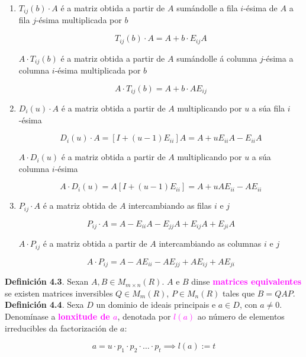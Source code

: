 \documentclass[twoside]{report}
\newcommand{\magbf}[1]{\textcolor{magenta}{\textbf{#1}}} %
\newcommand{\magen}[1]{\textcolor{magenta}{#1}}
\theoremstyle{mystyle}
\begin{document}
\begin{enumerate}
    \item $T_{ij}(b) \cdot A$ é a matriz obtida a partir de $A$ sumándolle a fila $i$-ésima de $A$ a fila $j$-ésima multiplicada por $b$
    
    $$T_{ij}(b) \cdot A = A + b \cdot E_{ij}A$$
    
    $A \cdot T_{ij}(b)$ é a matriz obtida a partir de $A$ sumándolle á columna $j$-ésima a columna $i$-ésima multiplicada por $b$
    
    $$A \cdot T_{ij}(b) = A + b \cdot AE_{ij}$$
    
    \item $D_{i}(u) \cdot A$ é a matriz obtida a partir de $A$ multiplicando por $u$ a súa fila $i$-ésima
    
    $$D_{i}(u) \cdot A = [I + (u-1)E_{ii}]A = A + uE_{ii}A - E_{ii}A$$
    
    $A \cdot D_{i}(u)$ é a matriz obtida a partir de $A$ multiplicando por $u$ a súa columna $i$-ésima
    
    $$A \cdot D_{i}(u) = A[I + (u-1)E_{ii}] = A + uAE_{ii} - AE_{ii}$$
    
    \item $P_{ij} \cdot A$ é a matriz obtida de $A$ intercambiando as filas $i$ e $j$
    
    $$P_{ij} \cdot A = A - E_{ii}A -E_{jj}A + E_{ij}A + E_{ji}A$$
    
    $A \cdot P_{ij}$ é a matriz obtida a partir de $A$ intercambiando as columnas $i$ e $j$
    
    $$A \cdot P_{ij} = A - AE_{ii} - AE_{jj} + AE_{ij} + AE_{ji}$$

\end{enumerate}

\vspace{5mm}

\noindent \textbf{Definición 4.3}. Sexan $A,B \in M_{m \times n}(R)$. $A$ e $B$ dinse \magbf{matrices equivalentes} se existen matrices inversibles $Q \in M_{m}(R)$, $P \in M_{n}(R)$ tales que $B = QAP$.\\

\noindent \textbf{Definición 4.4}. Sexa $D$ un dominio de ideais principais e $a \in D$, con $a \neq 0$. Denomínase a \magbf{lonxitude de $a$}, denotada por \magen{$l(a)$} ao número de elementos irreducibles da factorización de $a$:

$$a = u \cdot p_{1} \cdot p_{2} \cdot \dots \cdot p_{t} \implies l(a) := t$$
\end{document}
